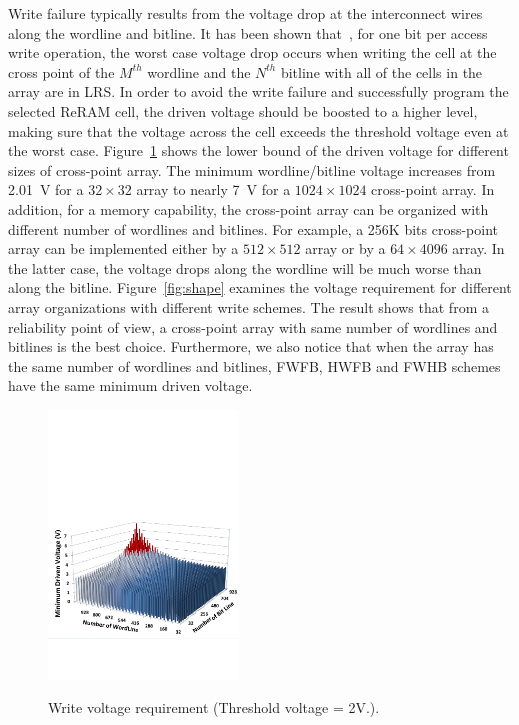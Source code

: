 Write failure typically results from the voltage drop at the interconnect
wires along the wordline and bitline. It has been shown
that~\cite{crossbar_TED_2010}, for one bit per access write operation, the
worst case voltage drop occurs when writing the cell at the cross point of
the $M^{th}$ wordline and the $N^{th}$ bitline with all of the cells in
the array are in LRS. In order to avoid the write failure and successfully
program the selected ReRAM cell, the driven voltage should be boosted to a
higher level, making sure that the voltage across the cell exceeds the
threshold voltage even at the worst case. Figure~\ref{fig:worst_v} shows
the lower bound of the driven voltage for different sizes of cross-point
array. The minimum wordline/bitline voltage increases from 2.01~V for a
$32 \times 32$ array to nearly 7~V for a $1024 \times 1024$ cross-point
array. In addition, for a memory capability, the cross-point array can be
organized with different number of wordlines and bitlines. For example, a
256K bits cross-point array can be implemented either by a $512 \times
512$ array or by a $64 \times 4096$ array. In the latter case, the voltage
drops along the wordline will be much worse than along the bitline.
Figure~\ref{fig:shape} examines the voltage requirement for different
array organizations with different write schemes. The result shows that
from a reliability point of view, a cross-point array with same number of
wordlines and bitlines is the best choice. Furthermore, we also notice
that when the array has the same number of wordlines and bitlines, FWFB,
HWFB and FWHB schemes have the same minimum driven voltage.


\begin{figure}%
\centering
\hspace{-5pt}
  \includegraphics[width=0.45\textwidth]{./figures/worst_v_f.pdf}\\
  \caption{Write voltage requirement (Threshold voltage = 2V.). }\label{fig:worst_v}
  \vspace{-5pt}
\end{figure}


